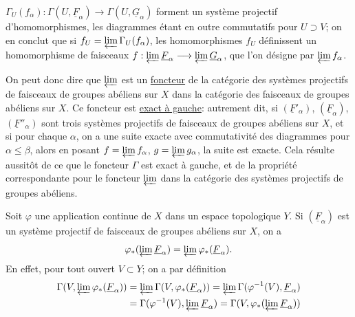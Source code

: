 $\Gamma_U(f_\alpha):\Gamma(U,\underline F_\alpha)\longrightarrow\Gamma(U,\underline G_\alpha)$ forment un système projectif d'homomorphismes, les diagrammes
étant en outre commutatifs pour $U\supset V$; on en conclut que si $f_U=\varprojlim\Gamma_U(f_\alpha)$, les homomorphismes $f_U$ définissent un homomorphisme de faisceaux $f:\varprojlim\underline F_\alpha\longrightarrow\varprojlim\underline G_\alpha$, que l'on désigne par $\varprojlim f_\alpha$.

On peut donc dire que $\varprojlim$ est un \uline{foncteur} de la catégorie des systèmes projectifs de faisceaux de groupes abéliens sur $X$ dans la catégorie des faisceaux de groupes abéliens sur $X$. Ce foncteur est \uline{exact à gauche}: autrement dit, si  $(\underline F'_\alpha)$, $(\underline F_\alpha)$, $(\underline F''_\alpha)$ sont trois systèmes projectifs de faisceaux de groupes abéliens sur $X$, et si pour chaque $\alpha$, on a une suite exacte avec commutativité des diagrammes
pour $\alpha\leq\beta$, alors en posant $f=\varprojlim f_\alpha$, $g=\varprojlim g_\alpha$, la suite
est exacte. Cela résulte aussitôt de ce que le foncteur $\Gamma$ est exact à gauche, et de la propriété correspondante pour le foncteur $\varprojlim$ dans la catégorie des systèmes projectifs de groupes abéliens.

Soit $\varphi$ une application continue de $X$ dans un espace topologique $Y$. Si $(\underline F_\alpha)$ est un système projectif de faisceaux de groupes abéliens sur $X$, on a
\[
\varphi_*(\varprojlim\underline F_\alpha)=\varprojlim\varphi_*(\underline F_\alpha).
\]
En effet, pour tout ouvert $V\subset Y$; on a par définition
\[
\begin{aligned}
\Gamma(V,\varprojlim\varphi_*(\underline F_\alpha))&=\varprojlim\Gamma(V,\varphi_*(\underline F_\alpha))=\varprojlim\Gamma(\varphi^{-1}(V),\underline F_\alpha)\\
&=\Gamma(\varphi^{-1}(V),\varprojlim\underline F_\alpha)=\Gamma(V,\varphi_*(\varprojlim\underline F_\alpha))
\end{aligned}
\]
